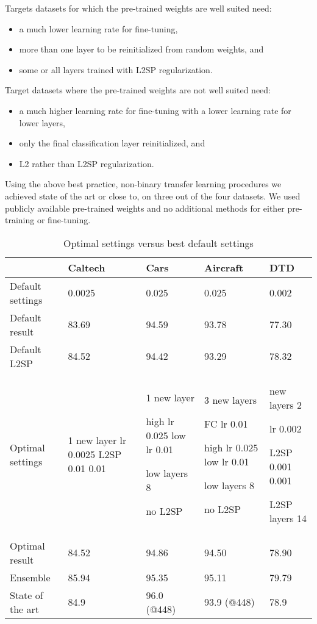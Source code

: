 \documentclass[]{article}
\begin{document}
Targets datasets for which the pre-trained weights are well suited need: 
\begin{itemize}
\item a much lower learning rate for fine-tuning,
\item more than one layer to
be reinitialized from random weights, and
\item some or all layers trained with L2SP regularization. 
\end{itemize}
Target datasets where the pre-trained weights are not well suited need: 
\begin{itemize}
\item a much higher learning rate for fine-tuning with a lower learning
rate for lower layers,
\item only the final classification layer reinitialized, and
\item L2 rather than L2SP regularization. 
\end{itemize}
Using the above best practice, non-binary transfer learning procedures
we achieved state of the art or close to, on three out of the four
datasets. We used publicly available pre-trained weights and no additional
methods for either pre-training or fine-tuning. 

\begin{table}[t!]

\caption{Optimal settings versus best default settings}
\label{final}
\centering
\begin{tabular}{p{2.3cm}p{2cm}p{2.4cm}p{2.4cm}p{2.2cm}}
\hline 
 & Caltech & Cars & Aircraft & DTD\tabularnewline
\hline 
Default settings & 0.0025  & 0.025  & 0.025  & 0.002 \tabularnewline
Default result & 83.69 & 94.59 & 93.78 & 77.30\tabularnewline
Default L2SP & 84.52 & 94.42 & 93.29 & 78.32\tabularnewline
\hline 
Optimal settings & 1 new layer lr 0.0025 L2SP 0.01 0.01  & 1 new layer

high lr 0.025    low lr 0.01 

low layers 8 

no L2SP & 3 new layers

FC lr 0.01

high lr 0.025   
low lr 0.01 

low layers 8

no L2SP & new layers 2 

lr 0.002 

L2SP 0.001 0.001

L2SP layers 14\tabularnewline
Optimal result & 84.52 & 94.86 & 94.50 & 78.90\tabularnewline
\hline 
Ensemble & 85.94 & 95.35 & 95.11 & 79.79 \tabularnewline
State of the art & 84.9 \cite{li2019delta} & 96.0 (@448) \cite{ridnik2020tresnet} & 93.9 (@448) \cite{zhuang2020learning} & 78.9 \cite{chen2020simple}\tabularnewline
\hline 
\end{tabular}
\end{table}
\end{document}
